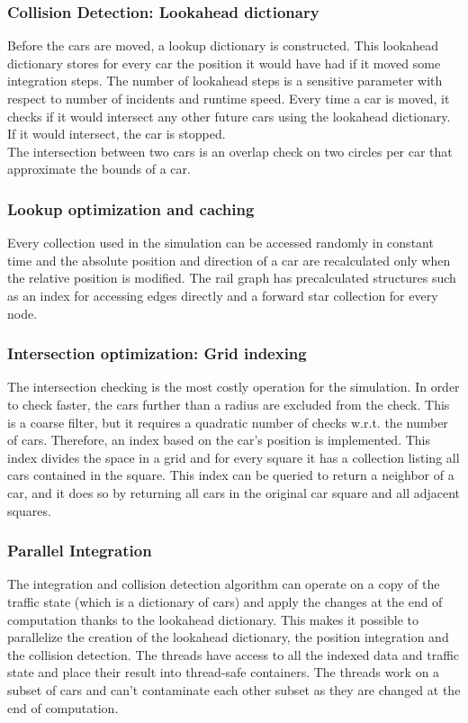 \documentclass{article}
\begin{document}
\subsubsection{Collision Detection:  Lookahead dictionary}
Before the cars are moved, a lookup dictionary is constructed. This lookahead dictionary stores for every car the position it would have had if it moved some integration steps. The number of lookahead steps is a sensitive parameter with respect to number of incidents and runtime speed. Every time a car is moved, it checks if it would intersect any other future cars using the lookahead dictionary. If it would intersect, the car is stopped. \\
The intersection between two cars is an overlap check on two circles per car that approximate the bounds of a car.

\subsubsection{Lookup optimization and caching}
Every collection used in the simulation can be accessed randomly in constant time and the absolute position and direction of a car are recalculated only when the relative position is modified. The rail graph has precalculated structures such as an index for accessing edges directly and a forward star collection for every node.

\subsubsection{Intersection optimization: Grid indexing}
The intersection checking is the most costly operation for the simulation. In order to check faster, the cars further than a radius are excluded from the check. This is a coarse filter, but it requires a quadratic number of checks w.r.t. the number of cars. Therefore, an index based on the car's position is implemented. This index divides the space in a grid and for every square it has a collection listing all cars contained in the square. This index can be queried to return a neighbor of a car, and it does so by returning all cars in the original car square and all adjacent squares. 

\subsubsection{Parallel Integration}
The integration and collision detection algorithm can operate on a copy of the traffic state (which is a dictionary of cars) and apply the changes at the end of computation thanks to the lookahead dictionary. This makes it possible to parallelize the creation of the lookahead dictionary, the position integration and the collision detection. The threads have access to all the indexed data and traffic state and place their result into thread-safe containers. The threads work on a subset of cars and can't contaminate each other subset as they are changed at the end of computation.
\end{document}
